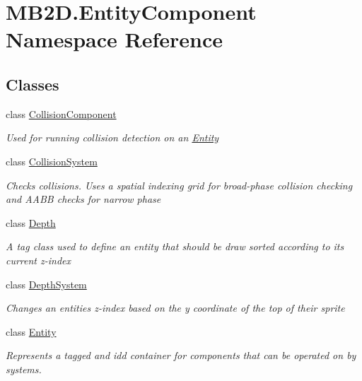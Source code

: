 \hypertarget{namespace_m_b2_d_1_1_entity_component}{}\section{M\+B2\+D.\+Entity\+Component Namespace Reference}
\label{namespace_m_b2_d_1_1_entity_component}
\subsection*{Classes}
\begin{DoxyCompactItemize}
\item 
class \hyperlink{class_m_b2_d_1_1_entity_component_1_1_collision_component}{Collision\+Component}
\begin{DoxyCompactList}\small\item\em Used for running collision detection on an \hyperlink{class_m_b2_d_1_1_entity_component_1_1_entity}{Entity} \end{DoxyCompactList}\item 
class \hyperlink{class_m_b2_d_1_1_entity_component_1_1_collision_system}{Collision\+System}
\begin{DoxyCompactList}\small\item\em Checks collisions. Uses a spatial indexing grid for broad-\/phase collision checking and A\+A\+BB checks for narrow phase \end{DoxyCompactList}\item 
class \hyperlink{class_m_b2_d_1_1_entity_component_1_1_depth}{Depth}
\begin{DoxyCompactList}\small\item\em A tag class used to define an entity that should be draw sorted according to its current z-\/index \end{DoxyCompactList}\item 
class \hyperlink{class_m_b2_d_1_1_entity_component_1_1_depth_system}{Depth\+System}
\begin{DoxyCompactList}\small\item\em Changes an entities z-\/index based on the y coordinate of the top of their sprite \end{DoxyCompactList}\item 
class \hyperlink{class_m_b2_d_1_1_entity_component_1_1_entity}{Entity}
\begin{DoxyCompactList}\small\item\em Represents a tagged and id\textquotesingle{}d container for components that can be operated on by systems. \end{DoxyCompactList}\item 

\end{DoxyCompactItemize}
